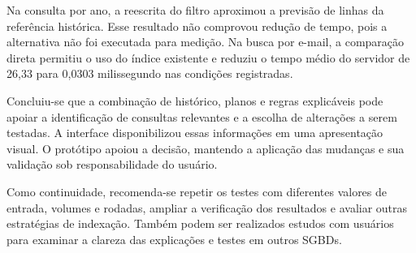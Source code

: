 \documentclass{UNESC}
\begin{document}
Na consulta por ano, a reescrita do filtro aproximou a previsão de linhas da referência histórica. Esse resultado não comprovou redução de tempo, pois a alternativa não foi executada para medição. Na busca por e-mail, a comparação direta permitiu o uso do índice existente e reduziu o tempo médio do servidor de 26,33 para 0,0303 milissegundo nas condições registradas.

Concluiu-se que a combinação de histórico, planos e regras explicáveis pode apoiar a identificação de consultas relevantes e a escolha de alterações a serem testadas. A interface disponibilizou essas informações em uma apresentação visual. O protótipo apoiou a decisão, mantendo a aplicação das mudanças e sua validação sob responsabilidade do usuário.

Como continuidade, recomenda-se repetir os testes com diferentes valores de entrada, volumes e rodadas, ampliar a verificação dos resultados e avaliar outras estratégias de indexação. Também podem ser realizados estudos com usuários para examinar a clareza das explicações e testes em outros SGBDs.


\FloatBarrier


\renewcommand{\refname}{REFERÊNCIAS}

\end{document}

